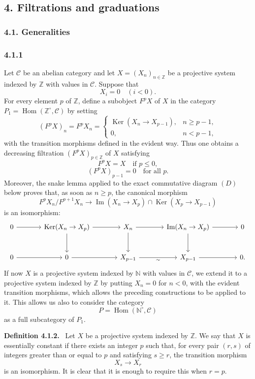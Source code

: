 \documentclass[11pt]{article}
\providecommand{\ZZ}{\mathbb{Z}}
\providecommand{\NN}{\mathbb{N}}
\newenvironment{statement}[1]{\par\medskip\noindent\textbf{#1.}\ }{\par\medskip}
\DeclareMathOperator{\Hom}{Hom}
\providecommand{\Ker}{\operatorname{Ker}}
\providecommand{\Hom}{\operatorname{Hom}}
\providecommand{\NN}{\mathbb N}
\providecommand{\cC}{\mathcal C}
\providecommand{\Im}{\operatorname{Im}}
\providecommand{\Ker}{\operatorname{Ker}}
\renewcommand{\Im}{\operatorname{Im}}
\providecommand{\Ker}{\operatorname{Ker}}
\providecommand{\Im}{\operatorname{Im}}
\providecommand{\cC}{\mathcal C}
\begin{document}
\subsection*{4. Filtrations and graduations}
\subsubsection*{4.1. Generalities}
\subsubsection*{4.1.1}
Let $\cC$ be an abelian category and let $X=(X_n)_{n\in\ZZ}$ be a projective system indexed by $\ZZ$ with values in $\cC$. Suppose that
\[
X_i=0\quad(i<0).
\]
For every element $p$ of $\ZZ$, define a subobject $F^pX$ of $X$ in the category $P_1=\Hom(\ZZ^\circ,\cC)$ by setting
\[
(F^pX)_n=F^pX_n=
\begin{cases}
\Ker(X_n\to X_{p-1}),& n\ge p-1,\\
0,& n<p-1,
\end{cases}
\]
with the transition morphisms defined in the evident way. Thus one obtains a decreasing filtration $(F^pX)_{p\in\ZZ}$ of $X$ satisfying
\[
F^pX=X\quad\text{if }p\le0,
\]
\[
(F^pX)_{p-1}=0\quad\text{for all }p.
\]
Moreover, the snake lemma applied to the exact commutative diagram $(D)$ below proves that, as soon as $n\ge p$, the canonical morphism
\[
F^pX_n/F^{p+1}X_n\longrightarrow \Im(X_n\to X_p)\cap\Ker(X_p\to X_{p-1})
\]
is an isomorphism:
\[
\begin{tikzcd}[column sep=large,row sep=large]
0 \arrow[r] & \Ker(X_n\to X_p) \arrow[r] \arrow[d] & X_n \arrow[r] \arrow[d] & \Im(X_n\to X_p) \arrow[r] \arrow[d] & 0\\
0 \arrow[r] & 0 \arrow[r] & X_{p-1} \arrow[r,"\sim"'] & X_{p-1} \arrow[r] & 0 .
\end{tikzcd}
\]
If now $X$ is a projective system indexed by $\NN$ with values in $\cC$, we extend it to a projective system indexed by $\ZZ$ by putting $X_n=0$ for $n<0$, with the evident transition morphisms, which allows the preceding constructions to be applied to it. This allows us also to consider the category
\[
P=\Hom(\NN^\circ,\cC)
\]
as a full subcategory of $P_1$.

\begin{statement}{Definition 4.1.2}
Let $X$ be a projective system indexed by $\ZZ$. We say that $X$ is essentially constant if there exists an integer $p$ such that, for every pair $(r,s)$ of integers greater than or equal to $p$ and satisfying $s\ge r$, the transition morphism
\[
X_s\longrightarrow X_r
\]
is an isomorphism. It is clear that it is enough to require this when $r=p$.
\end{statement}
\end{document}
